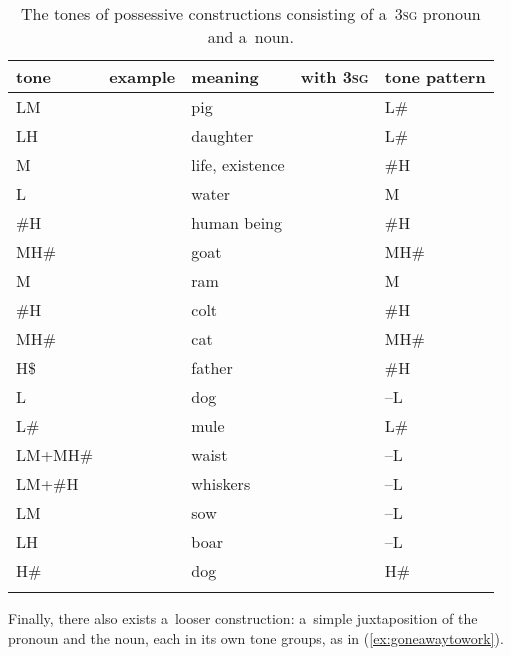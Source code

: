 \begin{table}%
\caption{\label{tab:thetonesofpossessiveconstructionsconsistingofa3sgpronounandanoun}The tones of {possessive} constructions consisting of a~3\textsc{sg} pronoun and a~noun.}
\begin{tabularx}{\textwidth}{ Q Q l l l }
\lsptoprule
	tone & example & meaning & with \textsc{3sg} & tone pattern\\ \midrule
	LM &  & pig &  & L\#\\
	LH &  & daughter &  & L\#\\
	M &  & life, existence &  & \#H\\
	L &  & water &  & M\\
	\#H &  & human being &  & \#H\\
	MH\# &  & goat &  & MH\#\\ \addlinespace \hdashline \addlinespace
	M &  & ram &  & M\\
	\#H &  & colt &  & \#H\\
	MH\# &  & cat &  & MH\#\\
	H\$ &  & father &  & \#H\\
	L &  & dog &  & --L\\
	L\# &  & mule &  & L\#\\
	LM+MH\# &  & waist &  & --L\\
	LM+\#H &  & whiskers &  & --L\\
	LM &  & sow &  & --L\\
	LH &  & boar &  & --L\\
	H\# &  & dog &  & H\#\\
\lspbottomrule
\end{tabularx}
\end{table}

 
Finally, there also exists a~looser construction: a~simple juxtaposition of the pronoun and the
noun, each in its own tone groups, as in (\ref{ex:goneawaytowork}). 

 

